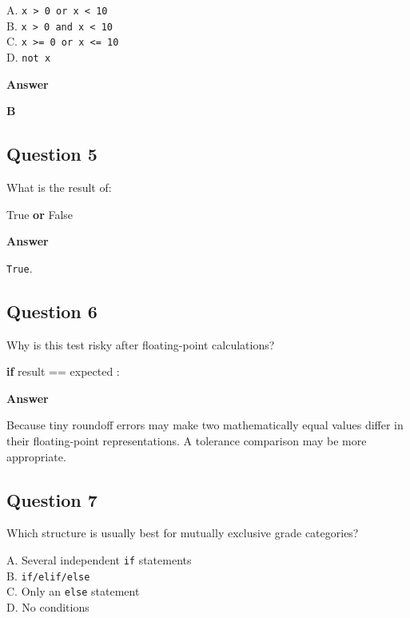 \documentclass[
  11pt,
  a4paper,
]{article}
\newenvironment{Shaded}{}{}
\newcommand{\ControlFlowTok}[1]{\textcolor[rgb]{0.00,0.44,0.13}{\textbf{#1}}}
\newcommand{\KeywordTok}[1]{\textcolor[rgb]{0.00,0.44,0.13}{\textbf{#1}}}
\newcommand{\NormalTok}[1]{#1}
\newcommand{\OperatorTok}[1]{\textcolor[rgb]{0.40,0.40,0.40}{#1}}
\newcommand{\VariableTok}[1]{\textcolor[rgb]{0.10,0.09,0.49}{#1}}
\begin{document}
A. \texttt{x\ \textgreater{}\ 0\ or\ x\ \textless{}\ 10}\\
B. \texttt{x\ \textgreater{}\ 0\ and\ x\ \textless{}\ 10}\\
C. \texttt{x\ \textgreater{}=\ 0\ or\ x\ \textless{}=\ 10}\\
D. \texttt{not\ x}

\textbf{Answer}

\textbf{B}

\subsection{Question 5}\label{question-5}

What is the result of:

\begin{Shaded}
\begin{Highlighting}[]
\VariableTok{True} \KeywordTok{or} \VariableTok{False}
\end{Highlighting}
\end{Shaded}

\textbf{Answer}

\texttt{True}.

\subsection{Question 6}\label{question-6}

Why is this test risky after floating-point calculations?

\begin{Shaded}
\begin{Highlighting}[]
\ControlFlowTok{if}\NormalTok{ result }\OperatorTok{==}\NormalTok{ expected :}
\end{Highlighting}
\end{Shaded}

\textbf{Answer}

Because tiny roundoff errors may make two mathematically equal values
differ in their floating-point representations. A tolerance comparison
may be more appropriate.

\subsection{Question 7}\label{question-7}

Which structure is usually best for mutually exclusive grade categories?

A. Several independent \texttt{if} statements\\
B. \texttt{if/elif/else}\\
C. Only an \texttt{else} statement\\
D. No conditions
\end{document}

